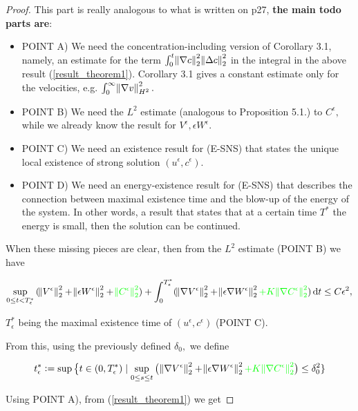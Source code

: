\documentclass[11pt]{article}
\newcommand*\diff{\mathop{}\!\mathrm{d}}
\begin{document}
\begin{proof}

This part is really analogous to what is written on p27, \textbf{the main todo parts are}:

\begin{itemize}

  \item POINT A) We need the concentration-including version of Corollary 3.1, namely, an estimate for the term $\int_0^t \norm{\nabla c}^2_2 \norm{\Delta c}^2_2$ in the integral in the above result (\ref{result_theorem1}). Corollary 3.1 gives a constant estimate only for the velocities, e.g. $\int_0^\infty \norm{\nabla v}^2_{H^2}.$
  \item POINT B) We need the $L^2$ estimate (analogous to Proposition 5.1.) to $C^\epsilon,$ while we already know the result for $V^\epsilon, \epsilon W^\epsilon.$
  \item POINT C) We need an existence result for (E-SNS) that states the unique local existence of strong solution $(u^\epsilon, c^\epsilon)$.
  \item POINT D) We need an energy-existence result for (E-SNS) that describes the connection between maximal existence time and the blow-up of the energy of the system. In other words, a result that states that at a certain time $T^*$ the energy is small, then the solution can be continued.

\end{itemize}

When these missing pieces are clear, then from the $L^2$ estimate (POINT B) we have

$$ \sup_{0 \leq t < T^*_\epsilon}{(\norm{V^\epsilon}^2_2 + \norm{\epsilon W^\epsilon}^2_2 + \textcolor{green}{\norm{C^\epsilon}^2_2}) } + \int_0^{T^*_\epsilon} (\norm{\nabla V^\epsilon}^2_2 + \norm{\epsilon \nabla W^\epsilon}^2_2 \textcolor{green}{+ K \norm{\nabla C^\epsilon}^2_2}) \diff t \leq C \epsilon^2, $$

$T^*_\epsilon$ being the maximal existence time of $(u^\epsilon, c^\epsilon)$ (POINT C).

From this, using the previously defined $\delta_0,$ we define

$$t^*_\epsilon:= \sup{ \big \{ t \in (0, T^*_\epsilon) \mid \sup_{0 \leq s \leq t}{\big (\norm{\nabla V^\epsilon}^2_2 + \norm{\epsilon \nabla W^\epsilon}^2_2 \textcolor{green}{+ K \norm{\nabla C^\epsilon}^2_2} \big ) \leq \delta_0^2}\} }$$

Using POINT A), from (\ref{result_theorem1}) we get


\end{proof}
\end{document}
